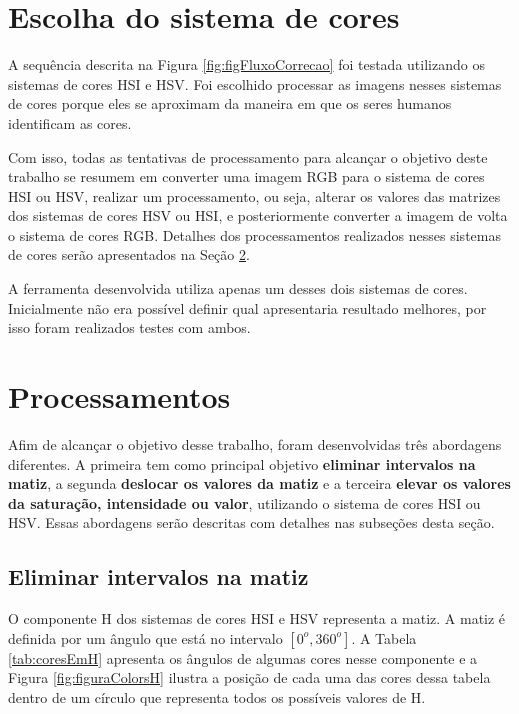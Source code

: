 \documentclass[	12pt, Times, openright, twoside, a4paper, english, brazil]{abntex2}
\begin{document}
\section{Escolha do sistema de cores}

A sequência descrita na Figura \ref{fig:figFluxoCorrecao} foi testada utilizando os sistemas de cores HSI e HSV. Foi escolhido processar as imagens nesses sistemas de cores porque eles se aproximam da maneira em que os seres humanos identificam as cores. 

Com isso, todas as tentativas de processamento para alcançar o objetivo deste trabalho se resumem em converter uma imagem RGB para o sistema de cores HSI ou HSV, realizar um processamento, ou seja, alterar os valores das matrizes dos sistemas de cores HSV ou HSI, e posteriormente converter a imagem de volta o sistema de cores RGB. Detalhes dos processamentos realizados nesses sistemas de cores serão apresentados na Seção \ref{sec:processamentoDasImagens}.

A ferramenta desenvolvida utiliza apenas um desses dois sistemas de cores. Inicialmente não era possível definir qual apresentaria resultado melhores, por isso foram realizados testes com ambos.

\section{Processamentos}
\label{sec:processamentoDasImagens}

Afim de alcançar o objetivo desse trabalho, foram desenvolvidas três abordagens diferentes. A primeira tem como principal objetivo \textbf{eliminar intervalos na matiz}, a segunda \textbf{deslocar os valores da matiz} e a terceira \textbf{elevar os valores da saturação, intensidade ou valor}, utilizando o sistema de cores HSI ou HSV. Essas abordagens serão descritas com detalhes nas subseções desta seção.

\subsection{Eliminar intervalos na matiz}
\label{subsec:eliminarIntervalosH}

O componente H dos sistemas de cores HSI e HSV representa a matiz. A matiz é definida por um ângulo que está no intervalo $[0^o,360^o]$. A Tabela \ref{tab:coresEmH} apresenta os ângulos de algumas cores nesse componente e a Figura \ref{fig:figuraColorsH} ilustra a posição de cada uma das cores dessa tabela dentro de um círculo que representa todos os possíveis valores de H.
\end{document}
